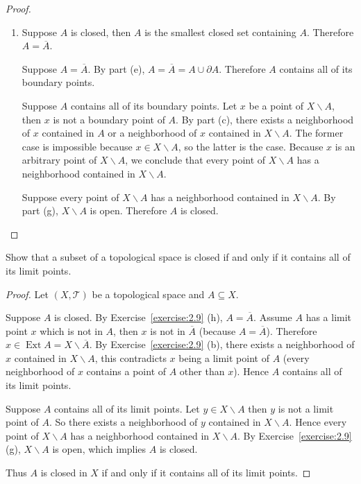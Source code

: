 \begin{proof}
\begin{enumerate}[label={(\alph*)}]
		\item Suppose $A$ is closed, then $A$ is the smallest closed set containing $A$. Therefore $A = \overline{A}$.

		      Suppose $A = \overline{A}$. By part (e), $A = \overline{A} = A\cup\partial A$. Therefore $A$ contains all of its boundary points.

		      Suppose $A$ contains all of its boundary points. Let $x$ be a point of $X\smallsetminus A$, then $x$ is not a boundary point of $A$. By part (c), there exists a neighborhood of $x$ contained in $A$ or a neighborhood of $x$ contained in $X\smallsetminus A$. The former case is impossible because $x\in X\smallsetminus A$, so the latter is the case. Because $x$ is an arbitrary point of $X\smallsetminus A$, we conclude that every point of $X\smallsetminus A$ has a neighborhood contained in $X\smallsetminus A$.

		      Suppose every point of $X\smallsetminus A$ has a neighborhood contained in $X\smallsetminus A$. By part (g), $X\smallsetminus A$ is open. Therefore $A$ is closed.
	\end{enumerate}
\end{proof}

\begin{exercise}{2.10}
	Show that a subset of a topological space is closed if and only if it contains all of its limit points.
\end{exercise}

\begin{proof}
	Let $(X, \mathscr{T})$ be a topological space and $A\subseteq X$.

	Suppose $A$ is closed. By Exercise~\ref{exercise:2.9} (h), $A = \overline{A}$. Assume $A$ has a limit point $x$ which is not in $A$, then $x$ is not in $\overline{A}$ (because $A = \overline{A}$). Therefore $x\in\operatorname{Ext} A = X\smallsetminus\overline{A}$. By Exercise~\ref{exercise:2.9} (b), there exists a neighborhood of $x$ contained in $X\smallsetminus A$, this contradicts $x$ being a limit point of $A$ (every neighborhood of $x$ contains a point of $A$ other than $x$). Hence $A$ contains all of its limit points.

	Suppose $A$ contains all of its limit points. Let $y\in X\smallsetminus A$ then $y$ is not a limit point of $A$. So there exists a neighborhood of $y$ contained in $X\smallsetminus A$. Hence every point of $X\smallsetminus A$ has a neighborhood contained in $X\smallsetminus A$. By Exercise~\ref{exercise:2.9} (g), $X\smallsetminus A$ is open, which implies $A$ is closed.

	Thus $A$ is closed in $X$ if and only if it contains all of its limit points.
\end{proof}

